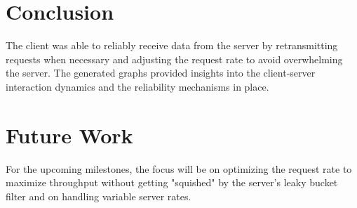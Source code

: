 \documentclass[12pt, a4paper]{article}
\begin{document}
\section{Conclusion}
The client was able to reliably receive data from the server by retransmitting requests when necessary and adjusting the request rate to avoid overwhelming the server. The generated graphs provided insights into the client-server interaction dynamics and the reliability mechanisms in place.

\section{Future Work}
For the upcoming milestones, the focus will be on optimizing the request rate to maximize throughput without getting "squished" by the server's leaky bucket filter and on handling variable server rates.
\end{document}
